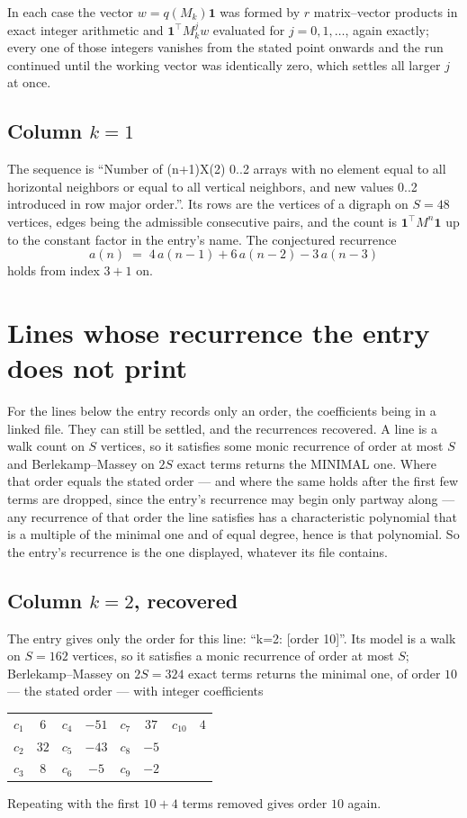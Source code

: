 \documentclass[11pt,a4paper]{article}
\theoremstyle{plain}
\theoremstyle{definition}
\begin{document}
In each case the vector $w=q(M_k)\mathbf{1}$ was formed by $r$ matrix--vector products in
exact integer arithmetic and $\mathbf{1}^{\!\top}M_k^{j}w$ evaluated for $j=0,1,\dots$,
again exactly; every one of those integers vanishes from the stated point onwards and the run
continued until the working vector was identically zero, which settles all larger $j$ at once.

\subsection*{Column $k$$=1$}
The sequence is ``Number of (n+1)X(2) 0..2 arrays with no element equal to all horizontal neighbors or equal to all vertical neighbors, and new values 0..2 introduced in row major order.''. Its rows are the vertices of a digraph on
$S=48$ vertices, edges being the admissible consecutive pairs, and the count is
$\mathbf{1}^{\!\top}M^{n}\mathbf{1}$ up to the constant factor in the entry's name.
The conjectured recurrence
\[
a(n)\;=\;4\,a(n-1) + 6\,a(n-2) - 3\,a(n-3)
\]
holds from index $3+1$ on.


\section{Lines whose recurrence the entry does not print}

For the lines below the entry records only an order, the coefficients being in a linked file.
They can still be settled, and the recurrences recovered. A line is a walk count on $S$
vertices, so it satisfies some monic recurrence of order at most $S$ and Berlekamp--Massey on
$2S$ exact terms returns the MINIMAL one. Where that order equals the stated order --- and
where the same holds after the first few terms are dropped, since the entry's recurrence may
begin only partway along --- any recurrence of that order the line satisfies has a
characteristic polynomial that is a multiple of the minimal one and of equal degree, hence is
that polynomial. So the entry's recurrence is the one displayed, whatever its file contains.

\subsection*{Column $k=2$, recovered}
The entry gives only the order for this line: ``k=2: [order 10]''. Its model is a walk on
$S=162$ vertices, so it satisfies a monic recurrence of order at most $S$;
Berlekamp--Massey on $2S=324$ exact terms returns the minimal one, of order
$10$ --- the stated order --- with integer coefficients
\begin{center}\small\begin{tabular}{cccccccc}
$c_{1}$ & $6$ & $c_{4}$ & $-51$ & $c_{7}$ & $37$ & $c_{10}$ & $4$ \\
$c_{2}$ & $32$ & $c_{5}$ & $-43$ & $c_{8}$ & $-5$ &  &  \\
$c_{3}$ & $8$ & $c_{6}$ & $-5$ & $c_{9}$ & $-2$ &  &  \\
\end{tabular}\end{center}
Repeating with the first $10+4$ terms removed gives order $10$ again.
\end{document}
